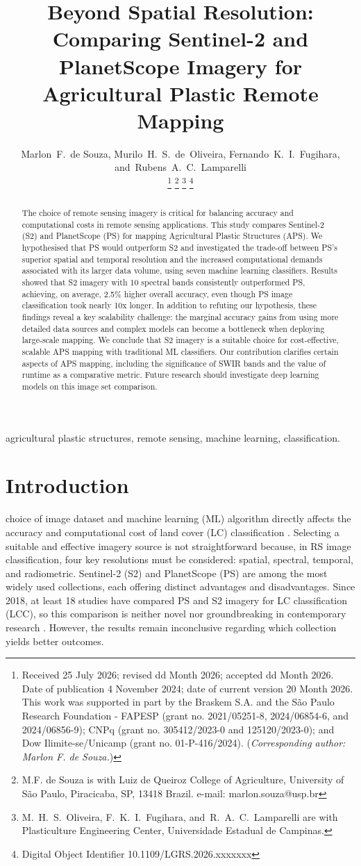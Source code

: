 \documentclass[journal]{IEEEtran}
\title{Beyond Spatial Resolution: Comparing Sentinel-2 and PlanetScope Imagery for Agricultural Plastic Remote Mapping}
\author{Marlon~F.~de Souza\orcidlink{0000-0002-7929-5790},
        Murilo~H.~S.~de~Oliveira\orcidlink{0009-0000-0691-4653},
        Fernando~K.~I.~Fugihara\orcidlink{0009-0009-4749-7361},
        and~Rubens~A.~C.~Lamparelli\orcidlink{0000-0003-4344-1263}%


\thanks{Received 25 July 2026; revised dd Month 2026; accepted dd Month
2026. Date of publication 4 November 2024; date of current version
20 Month 2026. This work was supported in part by the Braskem S.A. 
and the S\~ao Paulo Research Foundation - FAPESP (grant no. 2021/05251-8, 2024/06854-6, and 2024/06856-9); 
CNPq (grant no. 305412/2023-0 and 125120/2023-0); and Dow Ilimite-se/Unicamp (grant no. 01-P-416/2024).
(\textit{Corresponding author: Marlon F. de Souza.})}
\thanks{M.F. de Souza is with Luiz de Queiroz College of Agriculture, University of S\~ao Paulo, Piracicaba, SP, 13418 Brazil. e-mail: marlon.souza@usp.br}%
\thanks{M.~H.~S.~Oliveira, F.~K.~I.~Fugihara, and~R.~A.~C.~Lamparelli are with Plasticulture Engineering Center, Universidade Estadual de Campinas.}%
\thanks{Digital Object Identifier 10.1109/LGRS.2026.xxxxxxx}
}
\begin{document}
\maketitle

\begin{abstract}
The choice of remote sensing imagery is critical for balancing accuracy and computational costs in remote sensing applications. This study compares Sentinel-2 (S2) and PlanetScope (PS) for mapping Agricultural Plastic Structures (APS). We hypothesised that PS would outperform S2 and investigated the trade-off between PS's superior spatial and temporal resolution and the increased computational demands associated with its larger data volume, using seven machine learning classifiers. Results showed that S2 imagery with 10 spectral bands consistently outperformed PS, achieving, on average, 2.5\% higher overall accuracy, even though PS image classification took nearly 10x longer. In addition to refuting our hypothesis, these findings reveal a key scalability challenge: the marginal accuracy gains from using more detailed data sources and complex models can become a bottleneck when deploying large-scale mapping. We conclude that S2 imagery is a suitable choice for cost-effective, scalable APS mapping with traditional ML classifiers. Our contribution clarifies certain aspects of APS mapping, including the significance of SWIR bands and the value of runtime as a comparative metric. Future research should investigate deep learning models on this image set comparison.
\end{abstract}

\begin{IEEEkeywords}
agricultural plastic structures, remote sensing, machine learning, classification.
\end{IEEEkeywords}

\IEEEpeerreviewmaketitle

\section{Introduction}
 choice of image dataset and machine learning (ML) algorithm directly affects the accuracy and computational cost of land cover (LC) classification \cite{Sheykhmousa2020, Zhang2025, Li2022LCC}. Selecting a suitable and effective imagery source is not straightforward because, in RS image classification, four key resolutions must be considered: spatial, spectral, temporal, and radiometric. Sentinel-2 (S2) and PlanetScope (PS) are among the most widely used collections, each offering distinct advantages and disadvantages. Since 2018, at least 18 studies have compared PS and S2 imagery for LC classification (LCC), so this comparison is neither novel nor groundbreaking in contemporary research \cite{Basheer2024}. However, the results remain inconclusive regarding which collection yields better outcomes.
\end{document}
